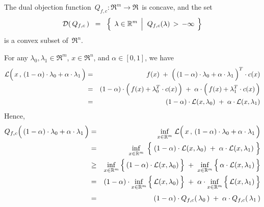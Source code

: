 \vskip 0.5cm
\begin{theorem}
\mbox{}
\vskip 0.1cm
\noindent
The dual objection function \,$Q_{f,c} : \Re^{m} \longrightarrow \Re$\, is concave,
and the set
\begin{equation*}
\mathcal{D}(\,Q_{f,c}\,)
\;\; = \;\;
	\left\{\;\,
		\lambda \in \Re^{m}
		\;\left\vert\;\;
		Q_{f,c}(\lambda) \,\overset{{\color{white}.}}{>}\, -\infty
		\right.
		\;\right\}
\end{equation*}
is a convex subset of \,$\Re^{n}$.
\end{theorem}
\proof
For any $\lambda_{0}, \lambda_{1} \in \Re^{m}$, $x \in \Re^{n}$, and $\alpha \in [0,1]$, we have
\begin{eqnarray*}
\mathcal{L}\!\left(\,x\,,\,(1-\alpha)\cdot\lambda_{0}\overset{{\color{white}.}}{+}\alpha\cdot\lambda_{1}\,\right)
& = &
	f(x) \;+\; \left(\,(1-\alpha)\cdot\lambda_{0}\overset{{\color{white}.}}{+}\alpha\cdot\lambda_{1}\,\right)^{T} \cdot c(x)
\\
& = &
	(1-\alpha)\cdot
	\left(\,f(x) \overset{{\color{white}.}}{+} \lambda_{0}^{T}\cdot c(x)\,\right)
	\;+\;
	\alpha\cdot
	\left(\,f(x) \overset{{\color{white}.}}{+}\lambda_{1}^{T} \cdot c(x)\,\right)
\\
& = &
	(1-\alpha) \cdot \mathcal{L}(x,\lambda_{0})
	\;+\;
	\alpha \cdot \mathcal{L}(x,\lambda_{1})
\end{eqnarray*}
Hence,
\begin{eqnarray*}
Q_{f,c}\!\left(\,(1-\alpha)\cdot\lambda_{0}\overset{{\color{white}.}}{+}\alpha\cdot\lambda_{1}\,\right)
& = &
	\underset{x\in\Re^{m}}{\inf}\;
	\mathcal{L}\!\left(\,x\,,\,(1-\alpha)\cdot\lambda_{0}\overset{{\color{white}.}}{+}\alpha\cdot\lambda_{1}\,\right)
\\
& = &
	\underset{x\in\Re^{m}}{\inf}\;\left\{\;
		(1-\alpha) \cdot \mathcal{L}(x,\lambda_{0})
		\;\overset{{\color{white}.}}{+}\;
		\alpha \cdot \mathcal{L}(x,\lambda_{1})
		\;\right\}
\\
& \geq &
	\underset{x\in\Re^{m}}{\inf}\left\{\,
		(1-\alpha) \cdot
		\overset{{\color{white}.}}{\mathcal{L}(x,\lambda_{0})}
		\,\right\}
	\; + \;
	\underset{x\in\Re^{m}}{\inf}\left\{\,
		\alpha \cdot
		\overset{{\color{white}.}}{\mathcal{L}(x,\lambda_{1})}
		\,\right\}
\\
& = &
	(1-\alpha) \cdot
	\underset{x\in\Re^{m}}{\inf}\left\{\,
		\overset{{\color{white}.}}{\mathcal{L}(x,\lambda_{0})}
		\,\right\}
	\; + \;
	\alpha \cdot
	\underset{x\in\Re^{m}}{\inf}\left\{\,
		\overset{{\color{white}.}}{\mathcal{L}(x,\lambda_{1})}
		\,\right\}
\\
& \overset{{\color{white}1}}{=} &
	(1-\alpha) \cdot Q_{f,c}(\,\lambda_{0}\,)
	\; + \;
	\alpha \cdot Q_{f,c}(\,\lambda_{1}\,)
\end{eqnarray*}
